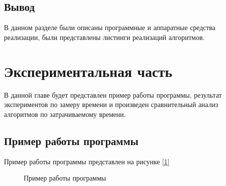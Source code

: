 \documentclass{article}
\begin{document}
	\subsection{Вывод}
	В данном разделе были описаны программные и аппаратные средства реализации, были представлены листинги реализаций алгоритмов.

	\newpage
	\section{Экспериментальная часть}
	В данной главе будет представлен пример работы программы, результат экспериментов по замеру времени и произведен сравнительный анализ алгоритмов по затрачиваемому времени.
	\subsection{Пример работы программы}
	Пример работы программы представлен на рисунке \hyperref[programmWork]{[\ref{programmWork}]}
	 	\begin{figure}[h!]
		 	\caption{Пример работы программы}
		 	\label{programmWork}
	 	\end{figure}
	
\end{document}
